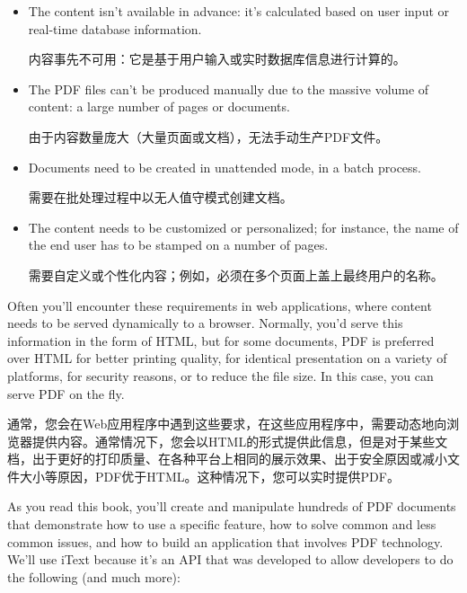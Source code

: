 \begin{itemize}
\item
The content isn’t available in advance: it’s calculated based on user input or real-time database information.

内容事先不可用：它是基于用户输入或实时数据库信息进行计算的。

\item
The PDF files can’t be produced manually due to the massive volume of content: a large number of pages or documents.

由于内容数量庞大（大量页面或文档），无法手动生产PDF文件。

\item
Documents need to be created in unattended mode, in a batch process.

需要在批处理过程中以无人值守模式创建文档。

\item
The content needs to be customized or personalized; for instance, the name of the end user has to be stamped on a number of pages.

需要自定义或个性化内容；例如，必须在多个页面上盖上最终用户的名称。
\end{itemize}
Often you’ll encounter these requirements in web applications, where content needs to be served dynamically to a browser. Normally, you’d serve this information in the form of HTML, but for some documents, PDF is preferred over HTML for better printing quality, for identical presentation on a variety of platforms, for security reasons, or to reduce the file size. In this case, you can serve PDF on the fly.

通常，您会在Web应用程序中遇到这些要求，在这些应用程序中，需要动态地向浏览器提供内容。通常情况下，您会以HTML的形式提供此信息，但是对于某些文档，出于更好的打印质量、在各种平台上相同的展示效果、出于安全原因或减小文件大小等原因，PDF优于HTML。这种情况下，您可以实时提供PDF。

As you read this book, you’ll create and manipulate hundreds of PDF documents that demonstrate how to use a specific feature, how to solve common and less common issues, and how to build an application that involves PDF technology. We’ll use iText because it’s an API that was developed to allow developers to do the following (and much more):

